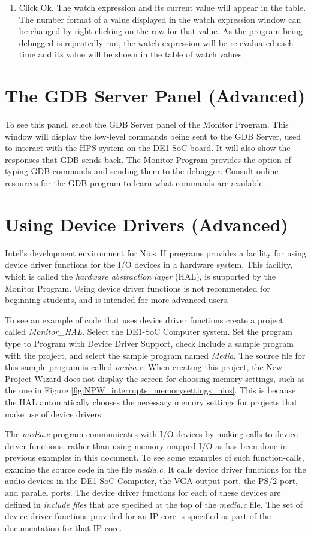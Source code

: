 \documentclass[11pt, twoside, pdftex]{article}
\begin{document}
\begin{enumerate}
\item Click \textsf{Ok}. The watch expression and its current
value will appear in the table. The number format of a value
displayed in the watch expression window can be changed by
right-clicking on the row for that value.  
As the program being debugged is repeatedly run, 
the watch expression will be re-evaluated each time and its value
will be shown in the table of watch values.
\end{enumerate}


\section{The GDB Server Panel (Advanced)}
To see this panel, select the {\sf GDB Server} panel of the
Monitor Program. This window will display the low-level commands
being sent to the GDB Server, used to interact with the HPS
system on the DE1-SoC board. It will also show the responses that GDB sends back. The Monitor Program provides the option
of typing GDB commands and sending them to the debugger. 
Consult online resources for the GDB program to learn what
commands are available.

\newpage
\section{Using Device Drivers (Advanced)}
Intel's development environment for Nios~II programs provides a
facility for using device driver functions for the I/O devices in
a hardware system. This facility, which is called the
{\it hardware abstraction layer} (HAL), is supported by the
Monitor Program. Using device driver functions is not recommended
for beginning students, and is intended for more advanced users. 

To see an example of code that uses device driver functions
create a project called {\it Monitor\_HAL}. 
Select the DE1-SoC Computer system. Set the program type to 
{\sf Program with Device Driver Support}, 
check {\sf Include a sample program with the project}, 
and select the sample program named {\it Media}. The source file
for this sample program is called {\it media.c}.
When creating this project, the New Project Wizard does not
display the screen for choosing memory settings, such as the one in Figure \ref{fig:NPW_interrupts_memorysettings_nios}. This is because the HAL automatically chooses 
the necessary memory settings for projects that make use of device drivers.

The {\it media.c} program communicates with I/O devices by making
calls to device driver functions, rather than using memory-mapped
I/O as has been done in previous examples in this document.  
To see some examples of such function-calls, examine the source
code in the file {\it media.c}. It calls device driver functions
for the audio devices in the DE1-SoC Computer, the VGA output
port, the PS/2 port, and parallel ports. The device driver
functions for each of these devices are defined in 
{\it include files} that are specified at the top of the
{\it media.c} file. The set of device driver functions
provided for an IP core is specified as part of the documentation
for that IP core.
\end{document}
